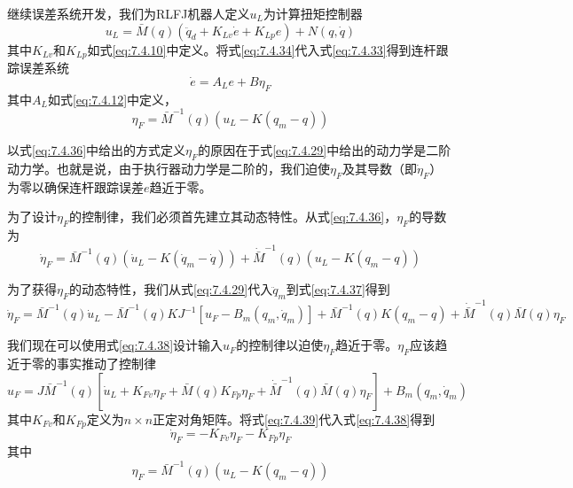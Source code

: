 \documentclass[UTF8]{ctexart}
\begin{document}
继续误差系统开发，我们为RLFJ机器人定义$u_L$为计算扭矩控制器
\begin{equation}\label{eq:7.4.34}
u_L = \bar{M}(q)(\ddot{q}_d + K_{Lv}\dot{e} + K_{Lp}e) + N(q,\dot{q})
\end{equation}
其中$K_{Lv}$和$K_{Lp}$如式\eqref{eq:7.4.10}中定义。将式\eqref{eq:7.4.34}代入式\eqref{eq:7.4.33}得到连杆跟踪误差系统
\begin{equation}\label{eq:7.4.35}
\dot{e} = A_L e + B\eta_F
\end{equation}
其中$A_L$如式\eqref{eq:7.4.12}中定义，
\begin{equation}\label{eq:7.4.36}
\eta_F = \bar{M}^{-1}(q)(u_L - K(q_m - q))
\end{equation}

以式\eqref{eq:7.4.36}中给出的方式定义$\eta_F$的原因在于式\eqref{eq:7.4.29}中给出的动力学是二阶动力学。也就是说，由于执行器动力学是二阶的，我们迫使$\eta_F$及其导数（即$\dot{\eta}_F$）为零以确保连杆跟踪误差$e$趋近于零。

为了设计$\eta_F$的控制律，我们必须首先建立其动态特性。从式\eqref{eq:7.4.36}，$\eta_F$的导数为
\begin{equation}\label{eq:7.4.37}
\dot{\eta}_F = \bar{M}^{-1}(q)(\dot{u}_L - K(\dot{q}_m - \dot{q})) + \dot{\bar{M}}^{-1}(q)(u_L - K(q_m - q))
\end{equation}

为了获得$\eta_F$的动态特性，我们从式\eqref{eq:7.4.29}代入$\ddot{q}_m$到式\eqref{eq:7.4.37}得到
\begin{equation}\label{eq:7.4.38}
\dot{\eta}_F = \bar{M}^{-1}(q)\dot{u}_L - \bar{M}^{-1}(q)KJ^{-1}[u_F - B_m(q_m,\dot{q}_m)] + \bar{M}^{-1}(q)K(q_m - q) + \dot{\bar{M}}^{-1}(q)\bar{M}(q)\eta_F
\end{equation}

我们现在可以使用式\eqref{eq:7.4.38}设计输入$u_F$的控制律以迫使$\eta_F$趋近于零。$\eta_F$应该趋近于零的事实推动了控制律
\begin{equation}\label{eq:7.4.39}
u_F = J\bar{M}^{-1}(q)[\dot{u}_L + K_{Fv}\eta_F + \bar{M}(q)K_{Fp}\eta_F + \dot{\bar{M}}^{-1}(q)\bar{M}(q)\eta_F] + B_m(q_m,\dot{q}_m)
\end{equation}
其中$K_{Fv}$和$K_{Fp}$定义为$n \times n$正定对角矩阵。将式\eqref{eq:7.4.39}代入式\eqref{eq:7.4.38}得到
\begin{equation}\label{eq:7.4.40}
\dot{\eta}_F = -K_{Fv}\eta_F - K_{Fp}\eta_F
\end{equation}
其中
\begin{equation*}
\eta_F = \bar{M}^{-1}(q)(u_L - K(q_m - q))
\end{equation*}
\end{document}
